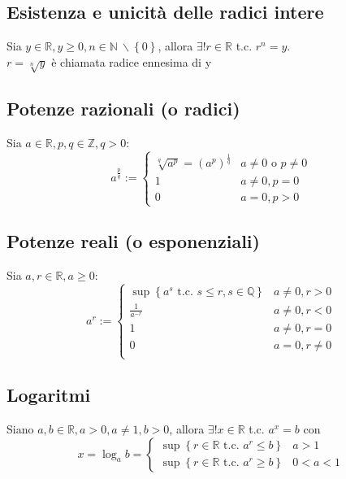 \documentclass[a4paper]{article}
\begin{document}
\subsection{Esistenza e unicità delle radici intere}
Sia \(y \in \mathbb{R}, y \geq 0, n \in \mathbb{N} \  \backslash \left\{ 0 \right\} \), allora \(\exists! r \in \mathbb{R}\) t.c. \(r ^ n = y\).\\
\(r = \sqrt[n]{y} \) è chiamata radice ennesima di y

\subsection{Potenze razionali (o radici)}
Sia \(a \in \mathbb{R}, p, q \in \mathbb{Z}, q > 0\):
\[ a ^ \frac{p}{q} := 
\begin{cases}
	\sqrt[q]{a ^ p} = \left( a ^ p \right) ^ \frac{1}{q} & a \neq 0 \text{ o } p \neq 0 \\
	1 & a \neq 0, p = 0 \\
	0 & a = 0, p > 0
\end{cases}
\]

\subsection{Potenze reali (o esponenziali)}
Sia \(a,r \in \mathbb{R}, a \geq 0\):
\[ a ^ r := 
\begin{cases}
	\sup  \left\{a ^ s \text{ t.c. } s \leq r, s \in \mathbb{Q} \right\} & a \neq 0, r > 0 \\
	\frac{1}{a ^ {-r}} & a \neq 0, r < 0 \\
	1 & a \neq 0, r = 0 \\
	0 & a = 0, r \neq 0 \\
\end{cases}
\]

\subsection{Logaritmi}
Siano \(a,b \in \mathbb{R}, a > 0, a \neq 1, b > 0\), allora \(\exists!  x \in \mathbb{R}\) t.c. \(a ^ x = b\) con
\[ x = \log_a b = 
\begin{cases}
	\sup  \left\{ r \in \mathbb{R} \text{ t.c. } a ^ r \leq b \right\} & a > 1 \\
	\sup  \left\{ r \in \mathbb{R} \text{ t.c. } a ^ r \geq b \right\} & 0 < a < 1
\end{cases}
\]
\end{document}
